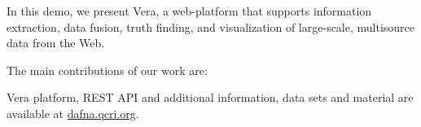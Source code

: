  
In this demo, we present {\scschape Vera}, a web-platform that supports information extraction, data fusion, truth finding, and visualization of large-scale, multisource data from the Web.

The main contributions of our work are:

 
 
{\scschape Vera} platform, REST API and additional information, data sets and material are available at \url{dafna.qcri.org}.


 
